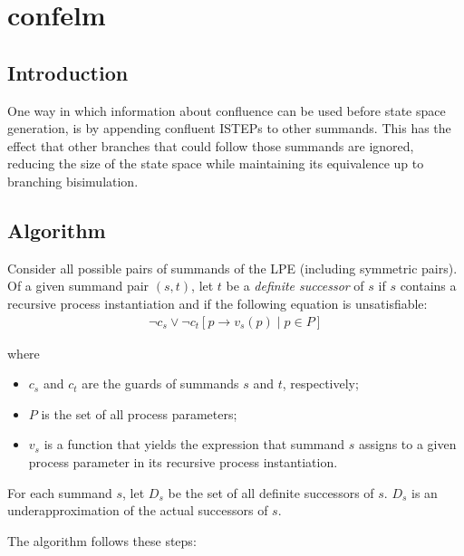\chapter{confelm}

\section{Introduction}
One way in which information about confluence can be used before state space generation, is by appending confluent ISTEPs to other summands.
This has the effect that other branches that could follow those summands are ignored, reducing the size of the state space while maintaining its equivalence up to branching bisimulation.

\section{Algorithm}

Consider all possible pairs of summands of the LPE (including symmetric pairs).
Of a given summand pair $(s, t)$, let $t$ be a \emph{definite successor} of $s$ if $s$ contains a recursive process instantiation and if the following equation is unsatisfiable:
\begin{align*}
\neg c_s \lor \neg {c_t}[p \rightarrow v_s(p) \;|\; p \in P]
\end{align*}

where

\begin{itemize}
\item $c_s$ and $c_t$ are the guards of summands $s$ and $t$, respectively;
\item $P$ is the set of all process parameters;
\item $v_s$ is a function that yields the expression that summand $s$ assigns to a given process parameter in its recursive process instantiation.
\end{itemize}

For each summand $s$, let $D_s$ be the set of all definite successors of $s$.
$D_s$ is an underapproximation of the actual successors of $s$.

\clearpage
The algorithm follows these steps:

